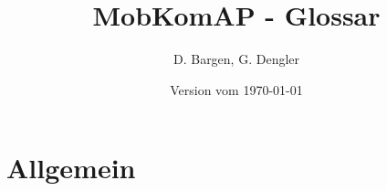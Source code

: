 \documentclass[10pt,a4paper]{scrartcl}
\author{D. Bargen, G. Dengler}
\title{MobKomAP - Glossar}
\date{Version vom \today}
\begin{document}
\begin{titlepage}
	\maketitle
	\begin{center}\Huge\ccPublicDomain\end{center}

	\vspace{100mm}

	\thispagestyle{empty} %
\end{titlepage}

\section{Allgemein}
\end{document}
